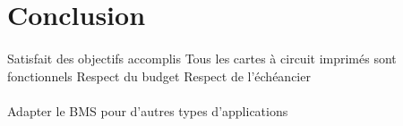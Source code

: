 \section{Conclusion}

	\paragraph{}
	Satisfait des objectifs accomplis
	Tous les cartes à circuit imprimés sont fonctionnels
	Respect du budget
	Respect de l’échéancier

	\paragraph{}	
	Adapter le BMS pour d'autres types d'applications